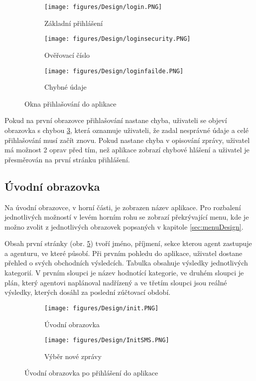 \documentclass[11pt,twoside,a4paper]{book}
\begin{document}
\begin{figure}[hbp]
	\centering
	\begin{subfigure}{.3\textwidth}
	  \centering
	  \texttt{[image: figures/Design/login.PNG]}
	  \caption{Základní přihlášení}
	  \label{fig:loginscreensa}
	\end{subfigure}%
	\begin{subfigure}{.3\textwidth}
	  \centering
	  \texttt{[image: figures/Design/loginsecurity.PNG]}
	  \caption{Ověřovací číslo}
	  \label{fig:loginscreensb}
	\end{subfigure}
	\begin{subfigure}{.3\textwidth}
		\centering
		\texttt{[image: figures/Design/loginfailde.PNG]}
		\caption{Chybné údaje}
		\label{fig:loginscreensc}
	\end{subfigure}
\caption{Okna přihlašování do aplikace}
\label{fig:loginscreens}
\end{figure}

Pokud na první obrazovce přihlašování nastane chyba, uživateli se objeví obrazovka s chybou \ref{fig:loginscreensc}, která oznamuje uživateli, že zadal nesprávné údaje a celé přihlašování musí začít znovu. Pokud nastane chyba v opisování zprávy, uživatel má možnost 2 oprav před tím, než aplikace zobrazí chybové hlášení a uživatel je přesměrován na první stránku přihlášení.

\subsection{Úvodní obrazovka}
Na úvodní obrazovce, v horní části, je zobrazen název aplikace. Pro rozbalení jednotlivých možností v levém horním rohu se zobrazí překrývající menu, kde je možno zvolit z jednotlivých obrazovek popsaných v kapitole \ref{sec:menuDesign}. 

Obsah první stránky (obr. \ref{fig:initscreensa}) tvoří jméno, příjmení, sekce kterou agent zastupuje a agenturu, ve které působí. Při prvním pohledu do aplikace, uživatel dostane přehled o svých obchodních výsledcích. Tabulka obsahuje výsledky jednotlivých kategorií. V prvním sloupci je název hodnotící kategorie, ve druhém sloupci je plán, který agentovi naplánoval nadřízený a ve třetím sloupci jsou reálné výsledky, kterých dosáhl za poslední zúčtovací období. 

\begin{figure}[ht]
	\centering
	\begin{subfigure}{.4\textwidth}
	  	\centering
	  	\texttt{[image: figures/Design/init.PNG]}
	  	\caption{Úvodní obrazovka}
	  	\label{fig:initscreensa}
	\end{subfigure}
	\begin{subfigure}{.4\textwidth}
	  	\centering
		\texttt{[image: figures/Design/InitSMS.PNG]}
	  	\caption{Výběr nové zprávy}
	  	\label{fig:initscreensb}
	\end{subfigure}
\caption{Úvodní obrazovka po přihlášení do aplikace}
\label{fig:initscreens}
\end{figure}
\end{document}
